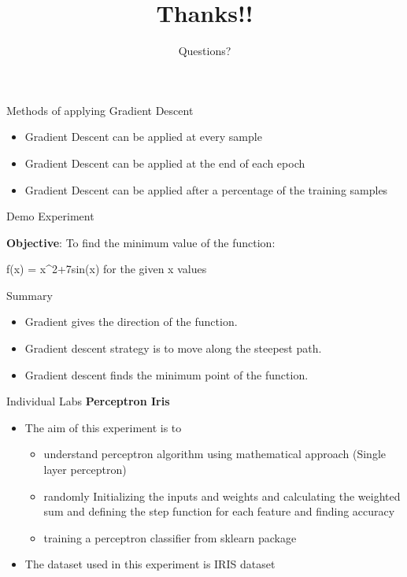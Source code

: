\documentclass[aspectratio=169,14pt,usenames,dvipsnames]{beamer}
\begin{document}
\begin{frame}{Methods of applying Gradient Descent}
\begin{itemize}
\item Gradient Descent can be applied at every sample
\item Gradient Descent can be applied at the end of each epoch
\item Gradient Descent can be applied after a percentage of the training samples
\end{itemize}
\end{frame}

\begin{frame}{Demo Experiment}
\item \textbf {Objective}: To find the minimum value of the function:
\begin{itemize}
\begin{itemize}
\hspace{1.75cm}f(x) = x^{2}+7sin(x) \hspace{0.15cm} for \hspace{0.15cm} the \hspace{0.15cm} given \hspace{0.15cm} x \hspace{0.15cm} values
\end{itemize}
\end{itemize}
\end{frame}

\begin{frame}{Summary}
\begin{itemize}
\item Gradient gives the direction of the function.
\item Gradient descent strategy is to move along the steepest path.
\item Gradient descent finds the minimum point of the function.
\end{itemize}
\end{frame}

\begin{frame}{Individual Labs}
\textbf {Perceptron Iris}
\begin{itemize}
\item The aim of this experiment is to 
\begin{itemize}
\item understand perceptron algorithm using mathematical approach (Single layer perceptron) 
\item randomly Initializing the inputs and weights and calculating the weighted sum and defining the step function for each feature and finding accuracy
\item training a perceptron classifier from sklearn package
\end{itemize}
\item The dataset used in this experiment is IRIS dataset
\end{itemize}
\end{frame}

{ \1
\begin{frame}
	\title{Thanks!!}
	\subtitle{Questions?}
	\maketitle
\end{frame}
}
\end{document}
